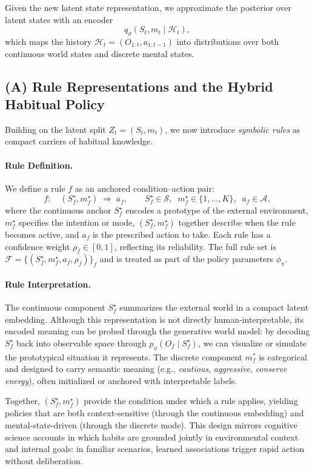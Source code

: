 \documentclass{article} %
\begin{document}
Given the new latent state representation, we approximate the posterior over latent states with an encoder
{\small \[
q_\vartheta(S_t,m_t\mid \mathcal H_t),
\]}
which maps the history \(\mathcal H_t=(O_{1:t},a_{1:t-1})\) into distributions over both continuous world states and discrete mental states.
\subsection{(A) Rule Representations and the Hybrid Habitual Policy}
\label{subsec:rules_policy}

Building on the latent split \(Z_t=(S_t,m_t)\), we now introduce \emph{symbolic rules} as compact carriers of habitual knowledge.  
\paragraph{Rule Definition.}
We define a rule \(f\) as an anchored condition–action pair:
{\small \[
f:\quad (S_f^\star, m_f^\star)\;\Rightarrow\; a_f,
\qquad S_f^\star \in \mathcal S,\;\; m_f^\star \in \{1,\dots,K\},\;\; a_f \in \mathcal A,
\]}
where the continuous anchor $S_f^\star$ encodes a prototype of the external environment, 
$m_f^\star$ specifies the intention or mode, $(S_f^\star, m_f^\star)$ together describe when the rule becomes active, and \(a_f\) is the prescribed action to take.   
Each rule has a confidence weight \(\rho_f \in [0,1]\), reflecting its reliability. 
The full rule set is
$
\mathcal{F}=\{(S_f^\star, m_f^\star, a_f, \rho_f)\}_f
$
and is treated as part of the policy parameters \(\phi_\pi\).  

\paragraph{Rule Interpretation.} The continuous component $S_f^\star$ summarizes the external world in a compact latent embedding. 
Although this representation is not directly human-interpretable, its encoded meaning can be probed 
through the generative world model: by decoding $S_f^\star$ back into observable space through $p_\phi(O_f \mid S_f^\star)$, we can visualize 
or simulate the prototypical situation it represents. The discrete component $m_f^*$ is categorical 
and designed to carry semantic meaning (e.g., \emph{cautious}, \emph{aggressive}, \emph{conserve energy}), 
often initialized or anchored with interpretable labels.  

Together, $(S_f^\star, m_f^\star)$ provide the condition under which a rule applies, yielding policies that 
are both context-sensitive (through the continuous embedding) and mental-state-driven (through the 
discrete mode). This design mirrors cognitive science accounts in which habits are grounded jointly in 
environmental context and internal goals: in familiar scenarios, learned associations trigger rapid action 
without deliberation.  
\end{document}
